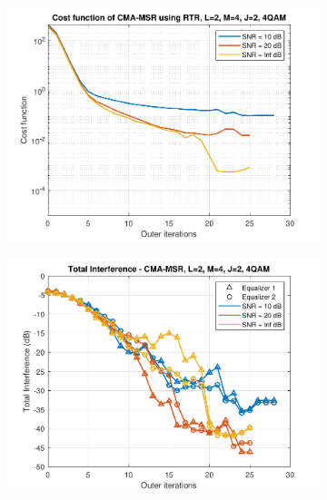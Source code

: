 \begin{figure}
	\centering
	\begin{subfigure}[b]{0.45\textwidth}
		\includegraphics[width=\linewidth]{./figs/BF_RTR_MSR_cost_4QAM_L=2_M=4_J=2_K=1000.pdf}
		\label{fig:rtr_msr_costqpsk}
	\end{subfigure}
	\begin{subfigure}[b]{0.45\textwidth}
		\includegraphics[width=\linewidth]{./figs/BF_RTR_MSR_TI_4QAM_L=2_M=4_J=2_K=1000.pdf}
		\label{fig:rtr_msr_ti_qpsk}
	\end{subfigure}\\
	\begin{subfigure}[b]{0.45\textwidth}

\end{subfigure}
\end{figure}
